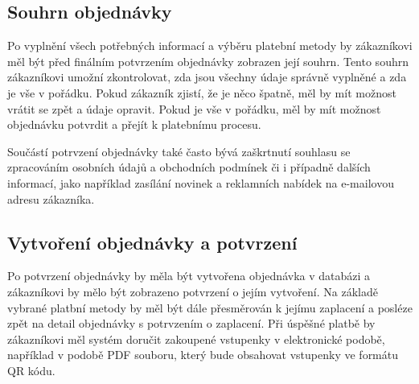 \subsection{Souhrn objednávky}
\label{sec:specifikace-dokonceni-objednavky-souhrn-objednavky}
Po vyplnění všech potřebných informací a výběru platební metody by zákazníkovi měl být před finálním potvrzením objednávky zobrazen její souhrn.
Tento souhrn zákazníkovi umožní zkontrolovat, zda jsou všechny údaje správně vyplněné a zda je vše v pořádku.
Pokud zákazník zjistí, že je něco špatně, měl by mít možnost vrátit se zpět a údaje opravit.
Pokud je vše v pořádku, měl by mít možnost objednávku potvrdit a přejít k platebnímu procesu.

Součástí potrvzení objednávky také často bývá zaškrtnutí souhlasu se zpracováním osobních údajů a obchodních podmínek či i případně dalších informací, jako například zasílání novinek a reklamních nabídek na e-mailovou adresu zákazníka.

\subsection{Vytvoření objednávky a potvrzení}
\label{sec:specifikace-dokonceni-objednavky-vytvoreni-objednavky-a-potvrzeni}
Po potvrzení objednávky by měla být vytvořena objednávka v databázi a zákazníkovi by mělo být zobrazeno potvrzení o jejím vytvoření.
Na základě vybrané platbní metody by měl být dále přesměrován k jejímu zaplacení a posléze zpět na detail objednávky s potrvzením o zaplacení.
Při úspěšné platbě by zákazníkovi měl systém doručit zakoupené vstupenky v elektronické podobě, například v podobě PDF souboru, který bude obsahovat vstupenky ve formátu QR kódu.

